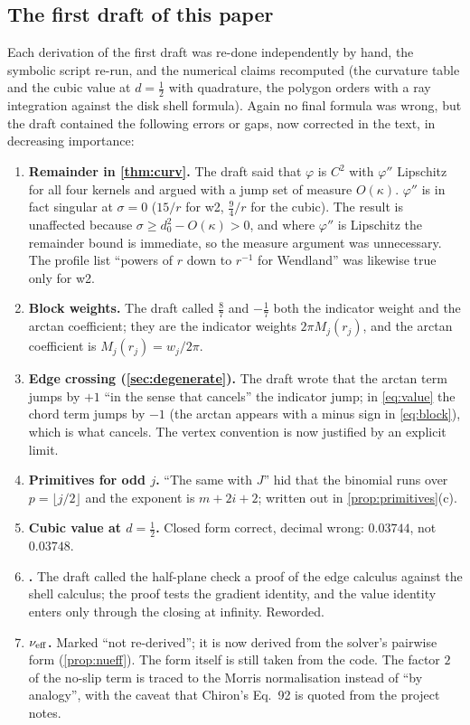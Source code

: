 \subsection{The first draft of this paper}
Each derivation of the first draft was re-done independently by hand, the symbolic script re-run, and the numerical claims recomputed (the curvature table and
the cubic value at $d=\frac12$ with quadrature, the polygon orders with a ray integration against the disk shell formula). Again no final formula was wrong, but the draft contained the
following errors or gaps, now corrected in the text, in decreasing importance:
\begin{enumerate}
\item \textbf{Remainder in \cref{thm:curv}.} The draft said that $\varphi$ is $C^2$ with $\varphi''$ Lipschitz for all four kernels and argued with a jump set of measure $O(\kappa)$.
$\varphi''$ is in fact singular at $\sigma=0$ ($15/r$ for w2, $\frac94/r$ for the cubic). The result is unaffected because $\sigma\ge d_0^2-O(\kappa)>0$, and where $\varphi''$ is Lipschitz the remainder
bound is immediate, so the measure argument was unnecessary. The profile list ``powers of $r$ down to $r^{-1}$ for Wendland'' was likewise true only for w2.
\item \textbf{Block weights.} The draft called $\frac87$ and $-\frac17$ both the indicator weight and the arctan coefficient; they are the indicator weights $2\pi M_j(r_j)$, and the arctan coefficient is $M_j(r_j)=w_j/2\pi$.
\item \textbf{Edge crossing (\cref{sec:degenerate}).} The draft wrote that the arctan term jumps by $+1$ ``in the sense that cancels'' the indicator jump; in \cref{eq:value} the chord term jumps by $-1$ (the arctan appears with a minus sign in \cref{eq:block}),
which is what cancels. The vertex convention is now justified by an explicit limit.
\item \textbf{Primitives for odd $j$.} ``The same with $J$'' hid that the binomial runs over $p=\lfloor j/2\rfloor$ and the exponent is $m+2i+2$; written out in \cref{prop:primitives}(c).
\item \textbf{Cubic value at $d=\frac12$.} Closed form correct, decimal wrong: $0.03744$, not $0.03748$.
\item \textbf{.} The draft called the half-plane check a proof of the edge calculus against the shell calculus; the proof tests the gradient identity, and the value identity enters only through the closing at infinity. Reworded.
\item \textbf{$\nu_{\rm eff}$.} Marked ``not re-derived''; it is now derived from the solver's pairwise form (\cref{prop:nueff}). The form itself is still taken from the code. The factor $2$ of the no-slip term is traced to the Morris normalisation instead of ``by analogy'', with the caveat that Chiron's Eq.~92 is quoted from the project notes.

\end{enumerate}
